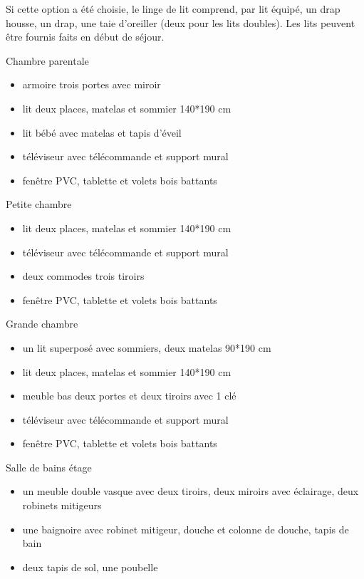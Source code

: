 \documentclass[a4paper,11pt]{article}
\begin{document}
Si cette option a été choisie, le linge de lit comprend, par lit équipé, un drap housse, un drap, une taie d'oreiller (deux pour les lits doubles). Les lits peuvent être fournis faits en début de séjour.
\vspace{0.5cm}


\vspace{0.25cm}

Chambre parentale
\begin{itemize}
\item armoire trois portes avec miroir
\item lit deux places, matelas et sommier 140*190 cm
\item lit bébé avec matelas et tapis d'éveil
\item téléviseur avec télécommande et support mural
\item fenêtre PVC, tablette et volets bois battants
\end{itemize}

\vspace{0.5cm}

Petite chambre
\begin{itemize}
\item lit deux places, matelas et sommier 140*190 cm
\item téléviseur avec télécommande et support mural
\item deux commodes trois tiroirs
\item fenêtre PVC, tablette et volets bois battants
\end{itemize}


\vspace{0.25cm}

Grande chambre
\begin{itemize}
\item un lit superposé avec sommiers, deux matelas 90*190 cm
\item lit deux places, matelas et sommier 140*190 cm
\item meuble bas deux portes et deux tiroirs avec 1 clé 
\item téléviseur avec télécommande et support mural
\item fenêtre PVC, tablette et volets bois battants
\end{itemize}
\vspace{0.25cm}

Salle de bains étage
\begin{itemize}
\item un meuble double vasque avec deux tiroirs, deux miroirs avec éclairage, deux robinets mitigeurs
\item une baignoire avec robinet mitigeur, douche et colonne de douche, tapis de bain
\item deux tapis de sol, une poubelle
\end{itemize}
\end{document}
